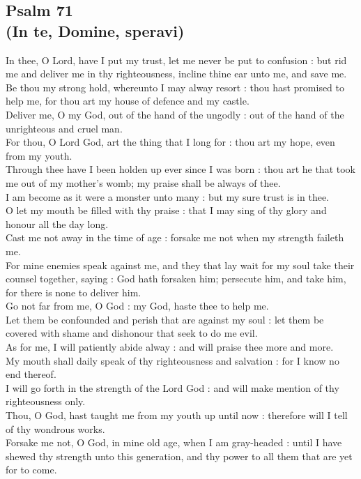\subsection{Psalm 71\\
(In te, Domine, speravi)}
In thee, O Lord, have I put my trust, let me never be put to confusion : but rid me and deliver me in thy righteousness, incline thine ear unto me, and save me.\\
Be thou my strong hold, whereunto I may alway resort : thou hast promised to help me, for thou art my house of defence and my castle.\\
Deliver me, O my God, out of the hand of the ungodly : out of the hand of the unrighteous and cruel man.\\
For thou, O Lord God, art the thing that I long for : thou art my hope, even from my youth.\\
\newpage
Through thee have I been holden up ever since I was born : thou art he that took me out of my mother's womb; my praise shall be always of thee.\\
I am become as it were a monster unto many : but my sure trust is in thee.\\
O let my mouth be filled with thy praise : that I may sing of thy glory and honour all the day long.\\
Cast me not away in the time of age : forsake me not when my strength faileth me.\\
For mine enemies speak against me, and they that lay wait for my soul take their counsel together, saying : God hath forsaken him; persecute him, and take him, for there is none to deliver him.\\
Go not far from me, O God : my God, haste thee to help me.\\
Let them be confounded and perish that are against my soul : let them be covered with shame and dishonour that seek to do me evil.\\
As for me, I will patiently abide alway : and will praise thee more and more.\\
My mouth shall daily speak of thy righteousness and salvation : for I know no end thereof.\\
I will go forth in the strength of the Lord God : and will make mention of thy righteousness only.\\
Thou, O God, hast taught me from my youth up until now : therefore will I tell of thy wondrous works.\\
Forsake me not, O God, in mine old age, when I am gray-headed : until I have shewed thy strength unto this generation, and thy power to all them that are yet for to come.\\
